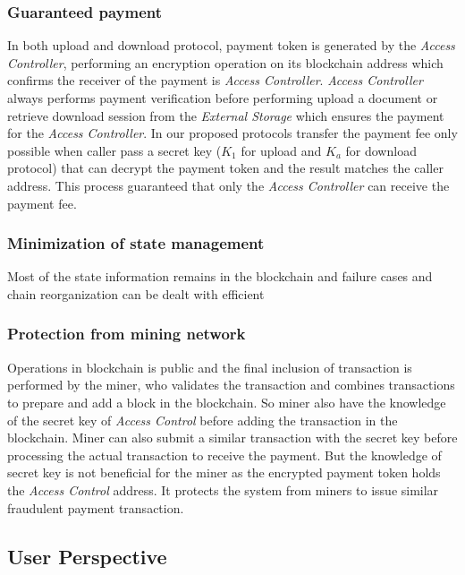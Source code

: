 \documentclass[letterpaper, 10 pt, conference]{ieeeconf}  %
\begin{document}
\subsubsection{Guaranteed payment}
In both upload and download protocol, payment token is generated by the {\it Access Controller}, performing an encryption operation on its blockchain address which confirms the receiver of the payment is {\it Access Controller}. {\it Access Controller} always performs payment verification before performing upload a document or retrieve download session from the {\it External Storage} which ensures the payment for the {\it Access Controller}.
In our proposed protocols transfer the payment fee only possible when caller pass a secret key ($K_1$ for upload and $K_a$ for download protocol) that can decrypt the payment token and the result matches the caller address. This process guaranteed that only the {\it Access Controller} can receive the payment fee.

\subsubsection{Minimization of state management}

Most of the state information remains in the blockchain and failure cases and chain reorganization
can be dealt with efficient

\subsubsection{Protection from mining network}
Operations in blockchain is public and the final inclusion of transaction is performed by the miner, who validates the transaction and combines transactions to prepare and add a block in the blockchain. So miner also have the knowledge of the secret key of {\it Access Control} before adding the transaction in the blockchain. Miner can also submit a similar transaction with the secret key before processing the actual transaction to receive the payment. But the knowledge of secret key is not  beneficial for the miner as the encrypted payment token holds the {\it Access Control} address. It protects the system from miners to issue similar fraudulent payment transaction.


\subsection{User Perspective}
\end{document}
